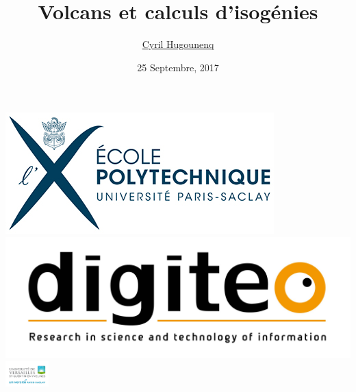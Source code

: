 \documentclass[10pt,a4paper]{beamer}
\theoremstyle{plain}
\theoremstyle{definition}
\theoremstyle{definition}
\theoremstyle{definition}
\theoremstyle{definition}
\theoremstyle{remark}
\theoremstyle{remark}
\begin{document}
\author{
\href{http://www.prism.uvsq.fr/~huc/}{Cyril Hugounenq}
}
\title[Volcans et calculs d'isogénies]{
Volcans et calculs d'isogénies}
\date{25 Septembre, 2017}


\begin{frame}
\titlepage

\hfill
\includegraphics[scale=0.6]{Images/Logo_Ecole_polytechnique_horizontal_300dpi.jpg} \hfill
\includegraphics[scale=0.1]{Images/digiteo.jpg}\hfill
\includegraphics[height=10mm]{Images/uvsq-logo-cmjn.jpg}
\end{frame}
\end{document}

